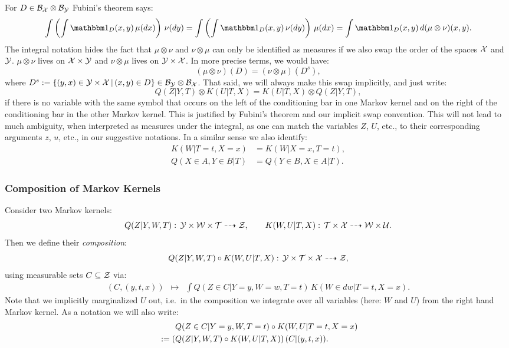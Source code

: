 \begin{Rem}\label{integration-order}
    For $D \in \mathcal{B}_{\mathcal{X}} \otimes \mathcal{B}_{\mathcal{Y}}$ Fubini's theorem says:
    \[ \int\lp\int \I_D(x,y)\, \mu(dx)\rp\,\nu(dy) = \int\lp\int \I_D(x,y)\, \nu(dy)\rp\,\mu(dx) = \int \I_D(x,y) \, d(\mu\otimes\nu)(x,y). \]
    The integral notation hides the fact that $\mu \otimes \nu$ and $\nu \otimes \mu$ can only be identified as measures if we also swap the order of the spaces $\mathcal{X}$ and $\mathcal{Y}$. $\mu \otimes \nu$ lives on $\mathcal{X} \times \mathcal{Y}$ and $\nu \otimes \mu$ lives on $\mathcal{Y} \times \mathcal{X}$. In more precise terms, we would have:
      \[ (\mu \otimes \nu)(D) = (\nu \otimes \mu)(D^s), \]
    where $D^s:=\left \{ (y,x) \in \mathcal{Y} \times \mathcal{X} \,\middle|\, (x,y) \in D \right \} \in \mathcal{B}_{\mathcal{Y}} \otimes \mathcal{B}_{\mathcal{X}}$.
    That said, we will always make this swap implicitly, and just write:
    \[ Q(Z|Y,T) \otimes K(U|T,X) = K(U|T,X) \otimes Q(Z|Y,T), \]
    if there is no variable with the same symbol that occurs on the left of the conditioning bar in one Markov kernel and on the right of the conditioning bar in the other Markov kernel.
    This is justified by Fubini's theorem and our implicit swap convention.
    This will not lead to much ambiguity, when interpreted as measures under the integral, as one can match
    the variables $Z$, $U$, etc., to their corresponding arguments $z$, $u$, etc., in our suggestive notations.
    In a similar sense we also identify:
    \begin{align*} K(W|T=t,X=x)&=K(W|X=x,T=t),\\ Q(X \in A,Y \in B|T) &= Q(Y \in B, X \in A|T). 
    \end{align*}
\end{Rem}

\subsubsection{Composition of Markov Kernels}

\begin{Def}
        \label{def-composition-markov-kernels}
    Consider two Markov kernels:
    \[ Q(Z|Y,W,T):\, \mathcal{Y} \times \mathcal{W}\times \mathcal{T} \dashrightarrow \mathcal{Z},\qquad  K(W,U|T,X):\, 
    \mathcal{T} \times \mathcal{X} \dashrightarrow \mathcal{W}\times\mathcal{U}. \]
    Then we define their \emph{composition}:
    \[ Q(Z|Y,W,T) \circ K(W,U|T,X) :\, \mathcal{Y} \times  \mathcal{T} \times \mathcal{X} \dashrightarrow \mathcal{Z}, \]
    using  measurable sets $C \subseteq \mathcal{Z}$ via:
    \[\begin{array}{ccl}
    (C,(y,t,x))    &\mapsto & \displaystyle \int Q(Z \in C|Y=y,W=w,T=t) \, K(W \in dw|T=t,X=x).
    \end{array}\]
    Note that we implicitly marginalized $U$ out, i.e.\ in the composition we integrate over all variables (here: $W$ and $U$) 
    from the right hand Markov kernel.
    As a notation we will also write:
    \begin{align*} & \qquad Q(Z \in C|Y=y,W,T=t) \circ K(W,U|T=t,X=x) \\
    &:= \left ( Q(Z|Y,W,T) \circ K(W,U|T,X)\right ) (C|(y,t,x)).  \end{align*}
\end{Def}


